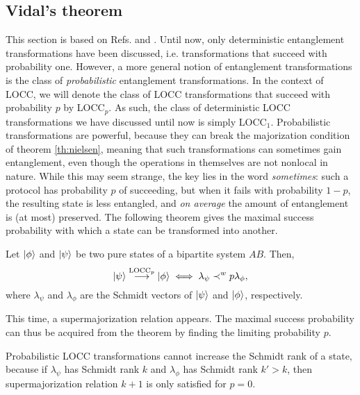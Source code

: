 \subsection{Vidal's theorem} \label{sec:vidal}

This section is based on Refs. \cite{vidal_entanglement_1999} and \cite{nielsen_majorization_2001}. Until now, only deterministic entanglement transformations have been discussed, i.e. transformations that succeed with probability one. However, a more general notion of entanglement transformations is the class of \textit{probabilistic} entanglement transformations. In the context of LOCC, we will denote the class of LOCC transformations that succeed with probability $p$ by LOCC$_p$. As such, the class of deterministic LOCC transformations we have discussed until now is simply LOCC$_1$. Probabilistic transformations are powerful, because they can break the majorization condition of theorem \ref{th:nielsen}, meaning that such transformations can sometimes gain entanglement, even though the operations in themselves are not nonlocal in nature. While this may seem strange, the key lies in the word \textit{sometimes}: such a protocol has probability $p$ of succeeding, but when it fails with probability $1-p$, the resulting state is less entangled, and \textit{on average} the amount of entanglement is (at most) preserved. The following theorem gives the maximal success probability with which a state can be transformed into another.

\begin{appendix_theorem} \label{th:vidal}
    Let $\ket{\phi}$ and $\ket{\psi}$ be two pure states of a bipartite system $AB$. Then,
    \begin{equation}
        \ket{\psi} \overset{\text{LOCC}_p}{\longrightarrow} \ket{\phi} \iff \lambda_\psi \prec^w p \lambda_\phi,
    \end{equation}
    where $\lambda_\psi$ and $\lambda_\phi$ are the Schmidt vectors of $\ket{\psi}$ and $\ket{\phi}$, respectively.
\end{appendix_theorem}


\noindent This time, a supermajorization relation appears. The maximal success probability can thus be acquired from the theorem by finding the limiting probability $p$. 

\begin{appendix_corollary}
    Probabilistic LOCC transformations cannot increase the Schmidt rank of a state, because if $\lambda_\psi$ has Schmidt rank $k$ and $\lambda_\phi$ has Schmidt rank $k' > k$, then supermajorization relation $k+1$ is only satisfied for $p=0$.
\end{appendix_corollary}





